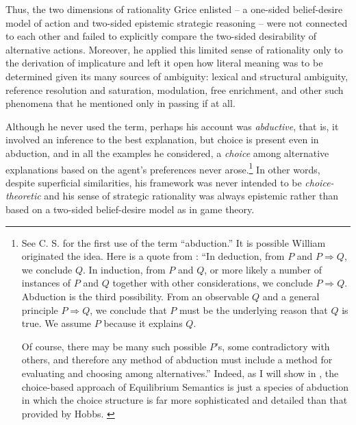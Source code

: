 Thus, the two dimensions of rationality Grice enlisted -- a one-sided belief-desire model of action and two-sided epistemic strategic reasoning -- were not connected to each other and failed to explicitly compare the two-sided desirability of alternative actions. Moreover, he applied this limited sense of rationality only to the derivation of implicature and left it open how literal meaning was to be determined given its many sources of ambiguity: lexical and structural ambiguity, reference resolution and saturation, modulation, free enrichment, and other such phenomena that he mentioned only in passing if at all.


Although he never used the term, perhaps his account was \emph{abductive}, that is, it involved an inference to the best explanation, but choice is present even in abduction, and in all the examples he considered, a \emph{choice} among alternative explanations based on the agent's preferences never arose.\footnote{See C. S. \citet[151]{peirce:ai} for the first use of the term ``abduction.'' It is possible William \citet{whewell:pis} originated the idea. Here is a quote from \citet[727--728]{hobbs:anlu}: ``In deduction, from $P$ and $P \Rightarrow Q$, we conclude $Q$. In induction, from $P$ and $Q$, or more likely a number of instances of $P$ and $Q$ together with other considerations, we conclude $P \Rightarrow Q$. Abduction is the third possibility. From an observable $Q$ and a general principle $P \Rightarrow Q$, we conclude that $P$ must be the underlying reason that $Q$ is true. We assume $P$ because it explains $Q$.

Of course, there may be many such possible $P$'s, some contradictory with others, and therefore any method of abduction must include a method for evaluating and choosing among alternatives.'' Indeed, as I will show in , the choice-based approach of Equilibrium Semantics is just a species of abduction in which the choice structure is far more sophisticated and detailed than that provided by Hobbs. \label{foot:abduction}} In other words, despite superficial similarities, his framework was never intended to be \emph{choice-theoretic} and his sense of strategic rationality was always epistemic rather than based on a two-sided belief-desire model as in game theory.

